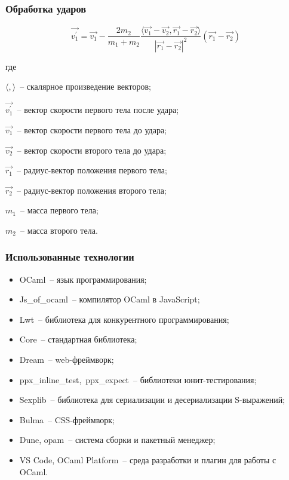 \documentclass[xetex,aspectratio=43]{beamer}
\newenvironment{Underequation}{
    \small
    \noindent
    где
    \hspace{-1.45ex}
    \setlength{\parindent}{3.5ex}
}{}
\begin{document}
\begin{frame}
    \frametitle{Обработка ударов}

    \begin{equation}\label{collisionhandle}
        \vec{v_1^\prime} = \vec{v_1} - \frac{2 m_2}{m_1 + m_2}
        \frac{\langle \vec{v_1} - \vec{v_2}, \vec{r_1} - \vec{r_2} \rangle }{\left| \vec{r_1} - \vec{r_2} \right|^2}
        (\vec{r_1} - \vec{r_2})
    \end{equation}

    \begin{Underequation}
        \(\langle , \rangle\)~-- скалярное произведение векторов;

        \(\vec{v_1^\prime}\)~-- вектор скорости первого тела после удара;

        \(\vec{v_1}\)~-- вектор скорости первого тела до удара;

        \(\vec{v_2}\)~-- вектор скорости второго тела до удара;

        \(\vec{r_1}\)~-- радиус-вектор положения первого тела;

        \(\vec{r_2}\)~-- радиус-вектор положения второго тела;

        \(m_1\)~-- масса первого тела;

        \(m_2\)~-- масса второго тела.
    \end{Underequation}

\end{frame}

\begin{frame}
    \frametitle{Использованные технологии}
    
    \begin{itemize}
        \item OCaml~-- язык программирования;
        \item Js\_of\_ocaml~-- компилятор OCaml в JavaScript;
        \item Lwt~-- библиотека для конкурентного программирования;
        \item Core~-- стандартная библиотека;
        \item Dream~-- web-фреймворк;
        \item ppx\_inline\_test,~ppx\_expect~-- библиотеки юнит-тестирования;
        \item Sexplib~-- библиотека для сериализации и десериализации S-выражений;
        \item Bulma~-- CSS-фреймворк;
        \item Dune, opam~-- система сборки и пакетный менеджер;
        \item VS Code, OCaml Platform~-- среда разработки и плагин для работы с OCaml.
    \end{itemize}


\end{frame}
\end{document}
